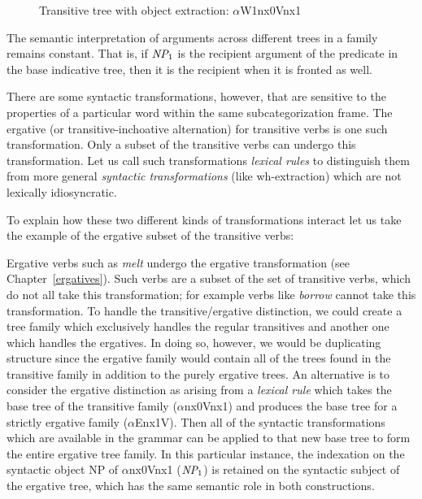 \begin{figure}[htb]
\centering
\mbox{}
\caption{Transitive tree with object extraction: $\alpha$W1nx0Vnx1}
\label{trans-extracted-tree}
\end{figure} 

The semantic interpretation of arguments across different trees in a
family remains constant.  That is, if $\mbox{\em NP}_1$ is the
recipient argument of the predicate in the base indicative tree, then
it is the recipient when it is fronted as well.

There are some syntactic transformations, however, that are sensitive to the
properties of a particular word within the same subcategorization frame. The
ergative (or transitive-inchoative alternation) for transitive verbs is one
such transformation. Only a subset of the transitive verbs can undergo this
transformation. Let us call such transformations {\em lexical rules} to
distinguish them from more general {\em syntactic transformations} (like
wh-extraction) which are not lexically idiosyncratic.

To explain how these two different kinds of transformations interact
let us take the example of the ergative subset of the transitive
verbs:

Ergative verbs such as {\it melt} undergo the ergative transformation (see
Chapter~\ref{ergatives}). Such verbs are a subset of the set of transitive
verbs, which do not all take this transformation; for example verbs like {\it
borrow} cannot take this transformation. To handle the transitive/ergative
distinction, we could create a tree family which exclusively handles the
regular transitives and another one which handles the ergatives.  In doing so,
however, we would be duplicating structure since the ergative family would
contain all of the trees found in the transitive family in addition to the
purely ergative trees.  An alternative is to consider the ergative distinction
as arising from a {\em lexical rule} which takes the base tree of the
transitive family ($\alpha$nx0Vnx1) and produces the base tree for a strictly
ergative family ($\alpha$Enx1V).  Then all of the syntactic transformations
which are available in the grammar can be applied to that new base tree to form
the entire ergative tree family.  In this particular instance, the indexation
on the syntactic object NP of $\alpha$nx0Vnx1 ($\mbox{\em NP}_1$) is retained
on the syntactic subject of the ergative tree, which has the same semantic role
in both constructions.


